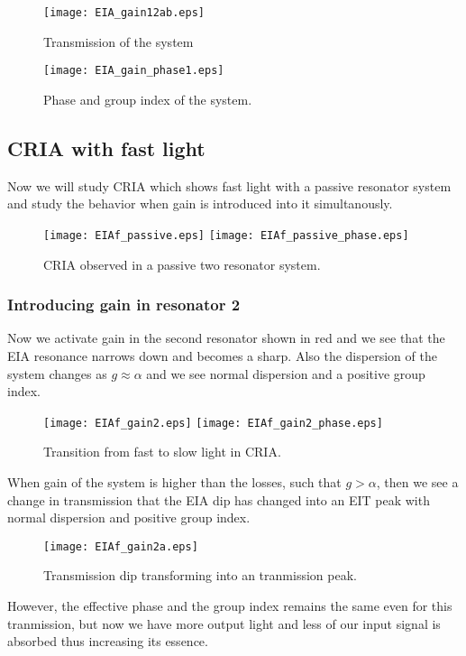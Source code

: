 \begin{figure}[h]
\centering
\texttt{[image: EIA\_gain12ab.eps]}
\caption{Transmission of the system}
\end{figure}
\newpage
\begin{figure}[h]
\centering
\texttt{[image: EIA\_gain\_phase1.eps]}
\caption{Phase and group index of the system.}
\end{figure}

\subsection{CRIA with fast light}
Now we will study CRIA which shows fast light with a passive resonator system and study the behavior when gain is introduced into it simultanously.

\begin{figure}[h]
\centering
\texttt{[image: EIAf\_passive.eps]}
\texttt{[image: EIAf\_passive\_phase.eps]}
\caption{CRIA observed in a passive two resonator system.}
\end{figure}

\subsubsection{Introducing gain in resonator 2}
Now we activate gain in the second resonator shown in red and we see that the EIA resonance narrows down and becomes a sharp. Also the dispersion of the system changes as $g \approx \alpha$ and we see normal dispersion and a positive group index.

\begin{figure}[h]
\centering
\texttt{[image: EIAf\_gain2.eps]}
\texttt{[image: EIAf\_gain2\_phase.eps]}
\caption{Transition from fast to slow light in CRIA.}
\end{figure}

When gain of the system is higher than the losses, such that $g > \alpha$, then we see a change in transmission that the EIA dip has changed into an EIT peak with normal dispersion and positive group index.

\begin{figure}[h]
\centering
\texttt{[image: EIAf\_gain2a.eps]}
\caption{Transmission dip transforming into an tranmission peak.}
\end{figure}

However, the effective phase and the group index remains the same even for this tranmission, but now we have more output light and less of our input signal is absorbed thus increasing its essence.
\newpage

